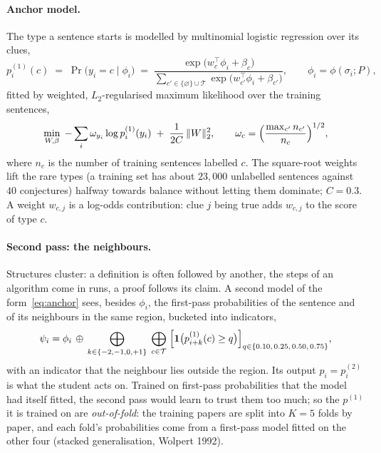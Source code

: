 \documentclass[10pt]{article}
\newcommand{\none}{\varnothing}
\begin{document}
\paragraph{Anchor model.}
The type a sentence starts is modelled by multinomial logistic regression over its clues,
%
\begin{equation}
  p^{(1)}_i(c) \;=\; \Pr\bigl(y_i=c \mid \phi_i\bigr)
  \;=\;
  \frac{\exp\bigl(w_c^{\top}\phi_i+\beta_c\bigr)}{\sum_{c'\in\{\none\}\cup\mathcal{T}}\exp\bigl(w_{c'}^{\top}\phi_i+\beta_{c'}\bigr)},
  \qquad \phi_i=\phi(\sigma_i;P),
  \label{eq:anchor}
\end{equation}
%
fitted by weighted, $L_2$-regularised maximum likelihood over the training sentences,
%
\begin{equation}
  \min_{W,\beta}\;
  -\sum_{i}\omega_{y_i}\log p^{(1)}_i(y_i)
  \;+\;\frac{1}{2C}\,\lVert W\rVert_2^2,
  \qquad
  \omega_c=\Bigl(\frac{\max_{c'}n_{c'}}{n_c}\Bigr)^{1/2},
  \label{eq:fit}
\end{equation}
%
where $n_c$ is the number of training sentences labelled $c$. The square-root weights lift the rare types (a training set has about $23{,}000$ unlabelled sentences against $40$ conjectures) halfway towards balance without letting them dominate; $C=0.3$. A weight $w_{c,j}$ is a log-odds contribution: clue $j$ being true adds $w_{c,j}$ to the score of type $c$.

\paragraph{Second pass: the neighbours.}
Structures cluster: a definition is often followed by another, the steps of an algorithm come in runs, a proof follows its claim. A second model of the form~\eqref{eq:anchor} sees, besides $\phi_i$, the first-pass probabilities of the sentence and of its neighbours in the same region, bucketed into indicators,
%
\begin{equation}
  \psi_i = \phi_i \,\oplus\, \bigoplus_{k\in\{-2,-1,0,+1\}}\;\bigoplus_{c\in\mathcal{T}}\;
  \Bigl[\mathbf{1}\bigl(p^{(1)}_{i+k}(c)\ge q\bigr)\Bigr]_{q\in\{0.10,\,0.25,\,0.50,\,0.75\}},
  \label{eq:context}
\end{equation}
%
with an indicator that the neighbour lies outside the region. Its output $p_i=p^{(2)}_i$ is what the student acts on. Trained on first-pass probabilities that the model had itself fitted, the second pass would learn to trust them too much; so the $p^{(1)}$ it is trained on are \emph{out-of-fold}: the training papers are split into $K=5$ folds by paper, and each fold's probabilities come from a first-pass model fitted on the other four (stacked generalisation, Wolpert 1992).
\end{document}
